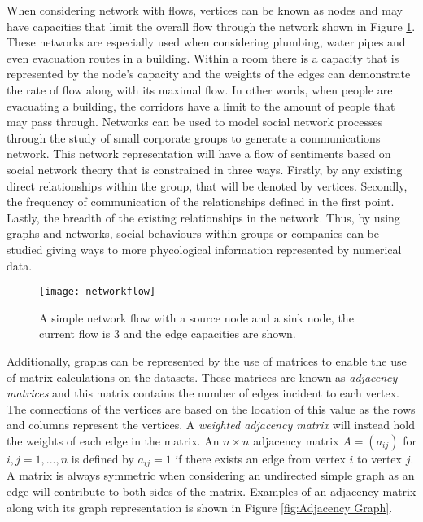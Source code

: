 When considering network with flows, vertices can be known as nodes and may have capacities that limit the overall flow through the network shown in Figure \ref{fig:Network Flow}. These networks are especially used when considering plumbing, water pipes and even evacuation routes in a building. Within a room there is a capacity that is represented by the node's capacity and the weights of the edges can demonstrate the rate of flow along with its maximal flow. In other words, when people are evacuating a building, the corridors have a limit to the amount of people that may pass through. Networks can be used to model social network processes through the study of small corporate groups to generate a communications network. This network representation will have a flow of sentiments based on social network theory \cite{ZACHARY1984259} that is constrained in three ways. Firstly, by any existing direct relationships within the group, that will be denoted by vertices. Secondly, the frequency of communication of the relationships defined in the first point. Lastly, the breadth of the existing relationships in the network. Thus, by using graphs and networks, social behaviours within groups or companies can be studied giving ways to more phycological information represented by numerical data.

\begin{figure}[!htb]
\centering
\texttt{[image: networkflow]}
\caption{A simple network flow with a source node and a sink node, the current flow is 3 and the edge capacities are shown.}
\label{fig:Network Flow}
\end{figure}

Additionally, graphs can be represented by the use of matrices to enable the use of matrix calculations on the datasets. These matrices are known as \emph{adjacency matrices} \cite{KnauerU.2011Agt:} and this matrix contains the number of edges incident to each vertex. The connections of the vertices are based on the location of this value as the rows and columns represent the vertices. A \emph{weighted adjacency matrix} will instead hold the weights of each edge in the matrix. An $n \times n$ adjacency matrix $A = (a_{ij})$ for $ i, j = 1, ..., n$ is defined by $a_{ij} = 1$ if there exists an edge from vertex $i$ to vertex $j$. A matrix is always symmetric when considering an undirected simple graph as an edge will contribute to both sides of the matrix. Examples of an adjacency matrix along with its graph representation is shown in Figure \ref{fig:Adjacency Graph}.
\newline

